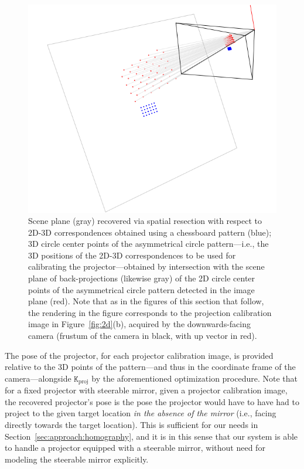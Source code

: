 \documentclass[review]{elsarticle}
\begin{document}
\begin{figure}
    \centerline{\includegraphics[scale=.35]{images/2d3d.png}}
    \caption{Scene plane (gray) recovered via spatial resection with respect to 2D-3D correspondences obtained using a chessboard pattern (blue); 3D circle center points of the asymmetrical circle pattern---i.e., the 3D positions of the 2D-3D correspondences to be used for calibrating the projector---obtained by intersection with the scene plane of back-projections (likewise gray) of the 2D circle center points of the asymmetrical circle pattern detected in the image plane (red). Note that as in the figures of this section that follow, the rendering in the figure corresponds to the projection calibration image in Figure~\ref{fig:2d}(b), acquired by the downwards-facing camera (frustum of the camera in black, with up vector in red).}
    \label{fig:3d}
\end{figure}

The pose of the projector, for each projector calibration image, is provided relative to the 3D points of the pattern---and thus in the coordinate frame of the camera---alongside $\mathtt{K}_\text{proj}$ by the aforementioned optimization procedure. Note that for a fixed projector with steerable mirror, given a projector calibration image, the recovered projector's pose is the pose the projector would have to have had to project to the given target location \textit{in the absence of the mirror} (i.e., facing directly towards the target location). This is sufficient for our needs in Section~\ref{sec:approach:homography}, and it is in this sense that our system is able to handle a projector equipped with a steerable mirror, without need for modeling the steerable mirror explicitly.
\end{document}
